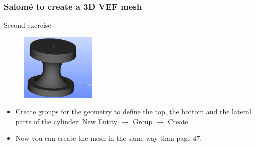 \documentclass[10pt]{beamer}
\begin{document}
\begin{frame}
\frametitle{Salom\'e to create a 3D VEF mesh}
\begin{block}{Second exercise}

\begin{figure}
\includegraphics[width=0.32\textwidth]{PICTURES/salome8.jpg}
\end{figure}

\begin{itemize}
\item Create groups for the geometry to define the top, the bottom and the lateral parts of the cylinder: New Entity $\rightarrow$ Group $\rightarrow$ Create
\item Now you can create the mesh in the same way than page 47.
\end{itemize}

\end{block}
\end{frame}
\end{document}
